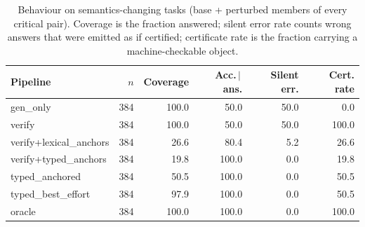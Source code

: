 \begin{table}[t]
\centering
\caption{Behaviour on semantics-changing tasks (base + perturbed members of every critical pair). Coverage is the fraction answered; silent error rate counts wrong answers that were emitted as if certified; certificate rate is the fraction carrying a machine-checkable object.}
\label{tab:critical}
\small
\begin{tabular}{lrrrrr}
\toprule
Pipeline & $n$ & Coverage & Acc.\,$\mid$\,ans. & Silent err. & Cert. rate \\
\midrule
gen\_only & 384 & 100.0 & 50.0 & 50.0 & 0.0 \\
verify & 384 & 100.0 & 50.0 & 50.0 & 100.0 \\
verify+lexical\_anchors & 384 & 26.6 & 80.4 & 5.2 & 26.6 \\
verify+typed\_anchors & 384 & 19.8 & 100.0 & 0.0 & 19.8 \\
typed\_anchored & 384 & 50.5 & 100.0 & 0.0 & 50.5 \\
typed\_best\_effort & 384 & 97.9 & 100.0 & 0.0 & 50.5 \\
oracle & 384 & 100.0 & 100.0 & 0.0 & 100.0 \\
\bottomrule
\end{tabular}
\end{table}
